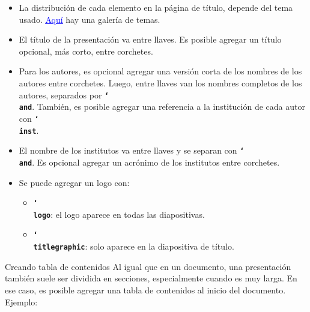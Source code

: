 \documentclass{beamer}
\newcommand{\bftt}[1]{\textbf{\texttt{#1}}}
\newcommand{\cmd}[1]{{\color{mygreen}\bftt{#1}}}
\newcommand{\bs}{\char`\\}
\newcommand{\cmdbs}[1]{\cmd{\bs#1}}
\begin{document}
    \begin{frame}
        \begin{itemize}
            \justifying
            \item La distribución de cada elemento en la página de título, depende del tema usado. \href{https://hartwork.org/beamer-theme-matrix/}{\textcolor{blue}{\underline{Aquí}}} hay una galería de temas.
            \item El título de la presentación va entre llaves. Es posible agregar un título opcional, más corto, entre corchetes.
            \item Para los autores, es opcional agregar una versión corta de los nombres de los autores entre corchetes. Luego, entre llaves van los nombres completos de los autores, separados por \cmdbs{and}. También, es posible agregar una referencia a la institución de cada autor con \cmdbs{inst}.
            \item El nombre de los institutos va entre llaves y se separan con \cmdbs{and}. Es opcional agregar un acrónimo de los institutos entre corchetes.
            \item Se puede agregar un logo con:
            \begin{itemize}
                \item \cmdbs{logo}: el logo aparece en todas las diapositivas.
                \item \cmdbs{titlegraphic}: solo aparece en la diapositiva de título.
            \end{itemize} 
        \end{itemize}
    \end{frame}

    \begin{frame}{Creando tabla de contenidos}
        \justifying
        Al igual que en un documento, una presentación también suele ser dividida en secciones, especialmente cuando es muy larga. En ese caso, es posible agregar una tabla de contenidos al inicio del documento. Ejemplo:
        \begin{center}
            \begin{minipage}{0.45\linewidth}
                \inputminted[fontsize=\scriptsize, frame=single]{latex}{contents_frame.tex}
            \end{minipage}
        \end{center}
    \end{frame}
\end{document}
